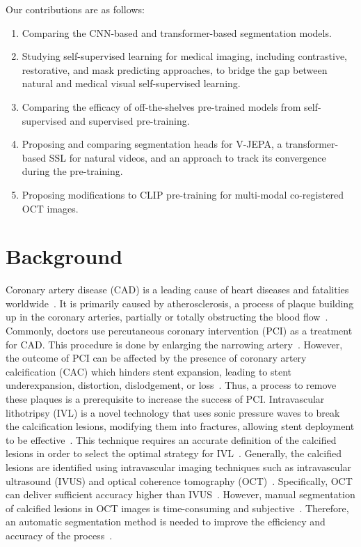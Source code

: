 \documentclass[a4paper,11pt,oneside]{report}
\begin{document}
Our contributions are as follows:
\begin{enumerate}
    \item Comparing the CNN-based and transformer-based segmentation models.
    \item Studying self-supervised learning for medical imaging, including contrastive, restorative, and mask predicting approaches, to bridge the gap between natural and medical visual self-supervised learning.
    \item Comparing the efficacy of off-the-shelves pre-trained models from self-supervised and supervised pre-training.
    \item Proposing and comparing segmentation heads for V-JEPA, a transformer-based SSL for natural videos, and an approach to track its convergence during the pre-training.
    \item Proposing modifications to CLIP pre-training for multi-modal co-registered OCT images.
\end{enumerate}

\chapter{Background}


Coronary artery disease (CAD) is a leading cause of heart diseases and fatalities worldwide~\cite{Virani2021Heart, Wu2015}. It is primarily caused by atherosclerosis, a process of plaque building up in the coronary arteries, partially or totally obstructing the blood flow~\cite{Shahjehan2023}. Commonly, doctors use percutaneous coronary intervention (PCI) as a treatment for CAD. This procedure is done by enlarging the narrowing artery~\cite{Ahmad2023}. However, the outcome of PCI can be affected by the presence of coronary artery calcification (CAC) which hinders stent expansion, leading to stent underexpansion, distortion, dislodgement, or loss~\cite{Hennessey2023}. Thus, a process to remove these plaques is a prerequisite to increase the success of PCI. Intravascular lithotripsy (IVL) is a novel technology that uses sonic pressure waves to break the calcification lesions, modifying them into fractures, allowing stent deployment to be effective~\cite{Butt2023}. This technique requires an accurate definition of the calcified lesions in order to select the optimal strategy for IVL~\cite{Butt2023}. Generally, the calcified lesions are identified using intravascular imaging techniques such as intravascular ultrasound (IVUS) and optical coherence tomography (OCT)~\cite{Butt2023}. Specifically, OCT can deliver sufficient accuracy higher than IVUS~\cite{Fujimoto2003, Costopoulos2016}. However, manual segmentation of calcified lesions in OCT images is time-consuming and subjective~\cite{Segars2013, Oktay2020, Carpenter2022}. Therefore, an automatic segmentation method is needed to improve the efficiency and accuracy of the process~\cite{Carpenter2022}.
\end{document}
